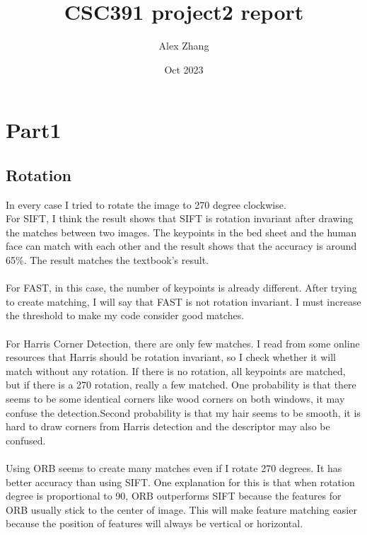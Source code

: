 \documentclass{article}
\title{CSC391 project2 report}
\author{Alex Zhang}
\date{Oct 2023}
\begin{document}
\maketitle
\section*{Part1}
\subsection*{Rotation}
In every case I tried to rotate the image to 270 degree clockwise.\\
For SIFT, I think the result shows that SIFT is rotation invariant after drawing the matches between two images.
The keypoints in the bed sheet and the human face can match with each other and the result shows that the accuracy is around 65\%.
The result matches the textbook's result.\\
\\
For FAST, in this case, the number of keypoints is already different.
After trying to create matching, I will say that FAST is not rotation invariant.
I must increase the threshold to make my code consider good matches.\\
\\
For Harris Corner Detection, there are only few matches.
I read from some online resources that Harris should be rotation invariant, so I check whether it will match without any rotation.
If there is no rotation, all keypoints are matched, but if there is a 270 rotation, really a few matched.
One probability is that there seems to be some identical corners like wood corners on both windows, it may confuse the detection.Second probability is that my hair seems to be smooth, it is hard to draw corners from Harris detection and the descriptor may also be confused.\\
\\
Using ORB seems to create many matches even if I rotate 270 degrees.
It has better accuracy than using SIFT.
One explanation for this is that when rotation degree is proportional to 90, ORB outperforms SIFT because the features for ORB usually stick to the center of image.
This will make feature matching easier because the position of features will always be vertical or horizontal.
\end{document}
